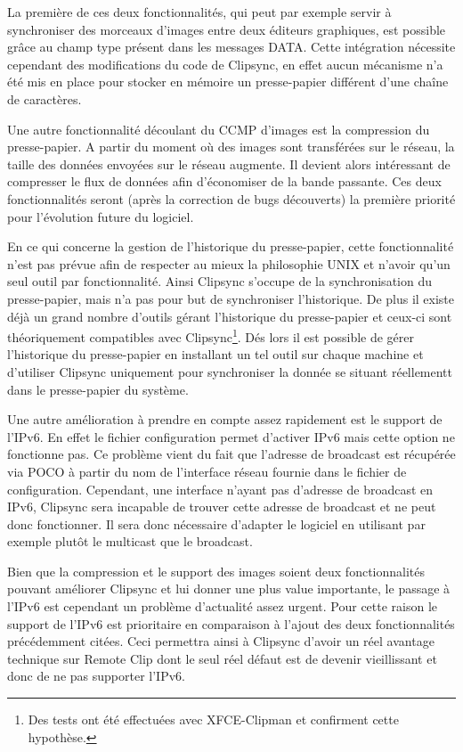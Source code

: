 La première de ces deux fonctionnalités, qui peut par exemple servir à
synchroniser des morceaux d'images entre deux éditeurs graphiques, est
possible grâce au champ type présent dans les messages DATA. Cette intégration
nécessite cependant des modifications du code de Clipsync, en effet aucun
mécanisme n'a été mis en place pour stocker en mémoire un presse-papier
différent d'une chaîne de caractères.

Une autre fonctionnalité découlant du CCMP d'images est la compression du
presse-papier. A partir du moment où des images sont transférées sur le
réseau, la taille des données envoyées sur le réseau augmente. Il devient
alors intéressant de compresser le flux de données afin d'économiser de la
bande passante. Ces deux fonctionnalités seront (après la correction
de bugs découverts) la première priorité pour l'évolution future du logiciel.

En ce qui concerne la gestion de l'historique du presse-papier, cette
fonctionnalité n'est pas prévue afin de respecter au mieux la philosophie
UNIX et n'avoir qu'un seul outil par fonctionnalité. Ainsi Clipsync
s'occupe de la synchronisation du presse-papier, mais n'a pas pour but de
synchroniser l'historique. De plus il existe déjà un grand nombre d'outils
gérant l'historique du presse-papier et ceux-ci sont théoriquement compatibles
avec Clipsync\footnote{Des tests ont été effectuées avec XFCE-Clipman et
confirment cette hypothèse.}. Dés lors il est possible de gérer l'historique
du presse-papier en installant un tel outil sur chaque machine et d'utiliser
Clipsync uniquement pour synchroniser la donnée se situant réellementt dans
le presse-papier du système.

Une autre amélioration à prendre en compte assez rapidement est le support
de l'IPv6. En effet le fichier configuration permet d'activer IPv6 mais
cette option ne fonctionne pas. Ce problème vient du fait que l'adresse
de broadcast est récupérée via POCO à partir du nom de l'interface réseau
fournie dans le fichier de configuration. Cependant, une interface n'ayant
pas d'adresse de broadcast en IPv6, Clipsync sera incapable de trouver
cette adresse de broadcast et ne peut donc fonctionner. Il sera donc nécessaire
d'adapter le logiciel en utilisant par exemple plutôt le multicast que le
broadcast.

Bien que la compression et le support des images soient deux fonctionnalités
pouvant améliorer Clipsync et lui donner une plus value importante, le passage
à l'IPv6 est cependant un problème d'actualité assez urgent. Pour cette
raison le support de l'IPv6 est prioritaire en comparaison à l'ajout des
deux fonctionnalités précédemment citées. Ceci permettra ainsi à Clipsync
d'avoir un réel avantage technique sur Remote Clip dont le seul réel défaut
est de devenir vieillissant et donc de ne pas supporter l'IPv6.

